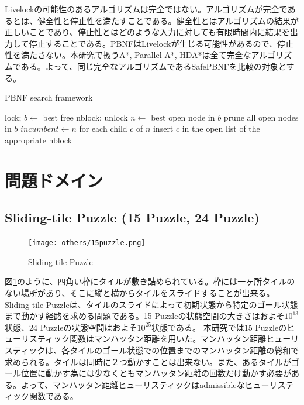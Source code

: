 \documentclass{jsarticle}
\renewcommand{\textbf}{} %
\begin{document}
Livelockの可能性のあるアルゴリズムは完全ではない。アルゴリズムが完全であるとは、健全性と停止性を満たすことである。健全性とはアルゴリズムの結果が正しいことであり、停止性とはどのような入力に対しても有限時間内に結果を出力して停止することである。PBNFはLivelockが生じる可能性があるので、停止性を満たさない。本研究で扱うA*, Parallel A*, HDA*は全て完全なアルゴリズムである。よって、同じ完全なアルゴリズムであるSafePBNFを比較の対象とする。

\begin{algorithm}                      
\caption{PBNF search framework}         
\label{alg:pbnf}                          
\begin{algorithmic}                  
	\STATE lock; $b \leftarrow$ best free nblock; unlock
		\STATE $n \leftarrow$ best open node in $b$
			\STATE prune all open nodes in $b$
			\STATE $incumbent \leftarrow n$
		\ELSE 
			\STATE for each child $c$ of $n$
			\STATE insert $c$ in the open list of the appropriate nblock
		\ENDIF
\ENDWHILE
\ENDWHILE
\end{algorithmic}
\end{algorithm}



\section{問題ドメイン}
\label{sec:domain}

\subsection{Sliding-tile Puzzle (15 Puzzle, 24 Puzzle)}

\begin{figure}
	\centering
	\texttt{[image: others/15puzzle.png]}
	\caption{Sliding-tile Puzzle}
	\label{fig:15puzzle}
\end{figure}%
図\ref{fig:15puzzle}のように、四角い枠にタイルが敷き詰められている。枠には一ヶ所タイルのない場所があり、そこに縦と横からタイルをスライドすることが出来る。\textbf{Sliding-tile Puzzle}は、タイルのスライドによって初期状態から特定のゴール状態まで動かす経路を求める問題である。15 Puzzleの状態空間の大きさはおよそ$10^{13}$状態、24 Puzzleの状態空間はおよそ$10^{25}$状態である。 本研究では15 Puzzleのヒューリスティック関数は\textbf{マンハッタン距離}を用いた。マンハッタン距離ヒューリスティックは、各タイルのゴール状態での位置までのマンハッタン距離の総和で求められる。タイルは同時に２つ動かすことは出来ない。また、あるタイルがゴール位置に動かす為には少なくともマンハッタン距離の回数だけ動かす必要がある。よって、マンハッタン距離ヒューリスティックはadmissibleなヒューリスティック関数である。
\newline
\end{document}
